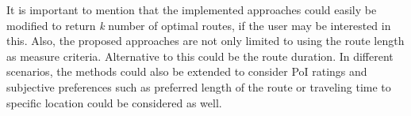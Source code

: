 It is important to mention that the implemented approaches could easily be modified to return \textit{k} number of optimal routes, if the user may be interested in this. Also, the proposed approaches are not only limited to using the route length  as measure criteria. Alternative to this could be the route duration. In different scenarios, the methods could also be extended to consider PoI ratings and subjective preferences such as preferred length of the route or traveling time to  specific location could be considered as well.  

